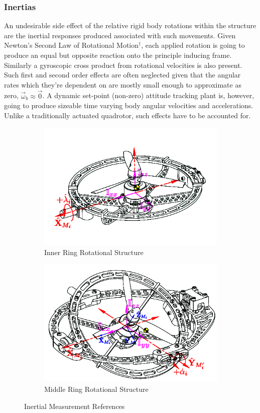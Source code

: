 \subsubsection*{Inertias}
An undesirable side effect of the relative rigid body rotations within the structure are the inertial responses produced associated with such movements. Given Newton's Second Law of Rotational Motion$^{\dagger}$, each applied rotation is going to produce an equal but opposite reaction onto the principle inducing frame. Similarly a gyroscopic cross product from rotational velocities is also present. Such first and second order effects are often neglected given that the angular rates which they're dependent on are mostly small enough to approximate as zero, $\vec{\omega}_b\approx\vec{0}$. A dynamic set-point (non-zero) attitude tracking plant is, however, going to produce sizeable time varying body angular velocities and accelerations. Unlike a traditionally actuated quadrotor, such effects have to be accounted for.
\begin{figure}[htbp]
\centering
\begin{subfigure}{0.49\textwidth}
\includegraphics[width=\textwidth]{figs/inertia-inner}
\caption{Inner Ring Rotational Structure}
\label{fig:inertia-inner}
\end{subfigure}
\begin{subfigure}{0.49\textwidth}
\includegraphics[width=\textwidth]{figs/inertia-middle}
\caption{Middle Ring Rotational Structure}
\label{fig:inertia-middle}
\end{subfigure}
\caption{Inertial Measurement References}
\end{figure}
